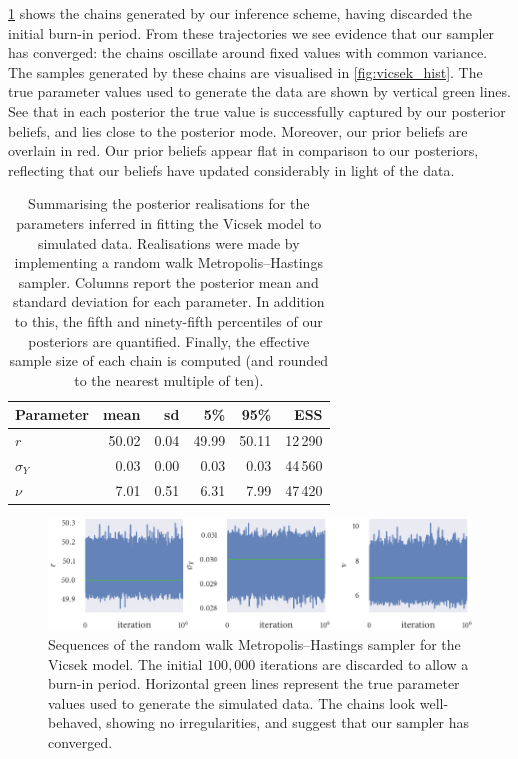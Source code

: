 \cref{fig:vicsek_trace} shows the chains generated by our inference scheme,
having discarded the initial burn-in period. From these trajectories we see evidence that
our sampler has converged: the chains oscillate around fixed values with common
variance.  The samples generated by these chains are visualised in
\cref{fig:vicsek_hist}.  The true parameter values used to generate the data
are shown by vertical green lines. See that in each posterior the true value is
successfully captured by our posterior beliefs, and lies close to the posterior mode.
Moreover, our prior beliefs are overlain in red. Our prior beliefs appear flat in
comparison to our posteriors, reflecting that our beliefs have updated considerably in
light of the data.

\begin{table}[tbp]
  \begin{tabular}{@{}lrrrrr@{}}
    \toprule
    Parameter    & mean  & sd   & 5\%   & 95\%  & ESS     \\
    \midrule
    $r$          & 50.02 & 0.04 & 49.99 & 50.11 & 12\,290 \\
    $\sigma_{Y}$ & 0.03  & 0.00 & 0.03  & 0.03  & 44\,560 \\
    $\nu$        & 7.01  & 0.51 & 6.31  & 7.99  & 47\,420 \\
    \bottomrule
  \end{tabular}
  \caption{Summarising the posterior realisations for the parameters inferred in fitting
    the Vicsek model to simulated data. Realisations were made by implementing a random
    walk Metropolis--Hastings sampler. Columns report the posterior mean and standard
    deviation for each parameter. In addition to this, the fifth and ninety-fifth
    percentiles of our posteriors are quantified. Finally, the effective sample size of each
    chain is computed (and rounded to the nearest multiple of ten).}
  \label{tab:vicsek_summary}
\end{table}%
\begin{figure}[tbp]
  \includegraphics{r_trace.pdf}
  \caption{Sequences of the random walk Metropolis--Hastings sampler for the Vicsek model.
    The initial $100,000$ iterations are discarded to allow a burn-in period. Horizontal
    green lines represent the true parameter values used to generate the simulated data.
    The chains look well-behaved, showing no irregularities, and suggest that our
    sampler has converged.}
  \label{fig:vicsek_trace}
\end{figure}%
